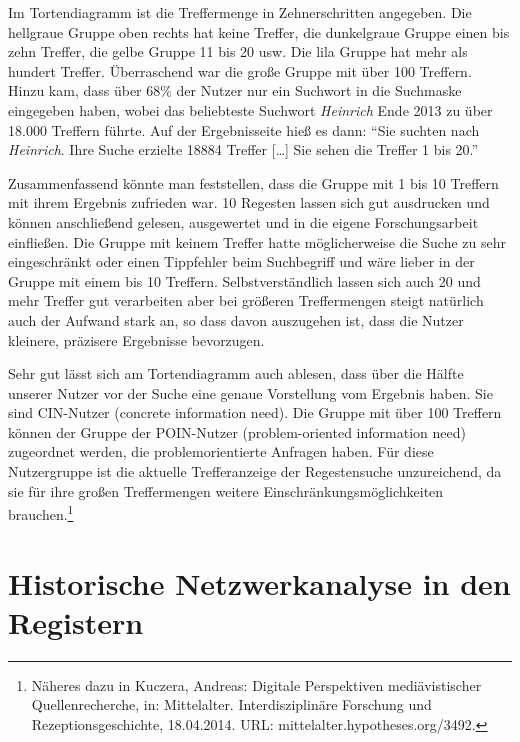 \documentclass[ngerman,]{scrreprt}
\begin{document}
Im Tortendiagramm ist die Treffermenge in Zehnerschritten angegeben. Die hellgraue Gruppe oben rechts hat keine Treffer, die dunkelgraue Gruppe einen bis zehn Treffer, die gelbe Gruppe 11 bis 20 usw. Die lila Gruppe hat mehr als hundert Treffer. Überraschend war die große Gruppe mit über 100 Treffern. Hinzu kam, dass über 68\% der Nutzer nur ein Suchwort in die Suchmaske eingegeben haben, wobei das beliebteste Suchwort \emph{Heinrich} Ende 2013 zu über 18.000 Treffern führte. Auf der Ergebnisseite hieß es dann: ``Sie suchten nach \emph{Heinrich}. Ihre Suche erzielte 18884 Treffer {[}\ldots{}{]} Sie sehen die Treffer 1 bis 20.''

Zusammenfassend könnte man feststellen, dass die Gruppe mit 1 bis 10 Treffern mit ihrem Ergebnis zufrieden war. 10 Regesten lassen sich gut ausdrucken und können anschließend gelesen, ausgewertet und in die eigene Forschungsarbeit einfließen. Die Gruppe mit keinem Treffer hatte möglicherweise die Suche zu sehr eingeschränkt oder einen Tippfehler beim Suchbegriff und wäre lieber in der Gruppe mit einem bis 10 Treffern. Selbstverständlich lassen sich auch 20 und mehr Treffer gut verarbeiten aber bei größeren Treffermengen steigt natürlich auch der Aufwand stark an, so dass davon auszugehen ist, dass die Nutzer kleinere, präzisere Ergebnisse bevorzugen.

Sehr gut lässt sich am Tortendiagramm auch ablesen, dass über die Hälfte unserer Nutzer vor der Suche eine genaue Vorstellung vom Ergebnis haben. Sie sind CIN-Nutzer (concrete information need). Die Gruppe mit über 100 Treffern können der Gruppe der POIN-Nutzer (problem-oriented information need) zugeordnet werden, die problemorientierte Anfragen haben. Für diese Nutzergruppe ist die aktuelle Trefferanzeige der Regestensuche unzureichend, da sie für ihre großen Treffermengen weitere Einschränkungsmöglichkeiten brauchen.\footnote{Näheres dazu in Kuczera, Andreas: Digitale Perspektiven mediävistischer Quellenrecherche, in: Mittelalter. Interdisziplinäre Forschung und Rezeptionsgeschichte, 18.04.2014. URL: mittelalter.hypotheses.org/3492.}

\hypertarget{historische-netzwerkanalyse-in-den-registern}{%
\section{Historische Netzwerkanalyse in den Registern}\label{historische-netzwerkanalyse-in-den-registern}}
\end{document}
